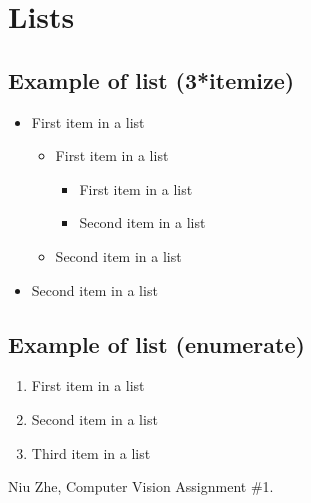 \documentclass[paper=a4, fontsize=11pt]{scrartcl} %
\numberwithin{equation}{section} %
\numberwithin{figure}{section} %
\numberwithin{table}{section} %
\begin{document}
\section{Lists}


\subsection{Example of list (3*itemize)}
\begin{itemize}
	\item First item in a list 
		\begin{itemize}
		\item First item in a list 
			\begin{itemize}
			\item First item in a list 
			\item Second item in a list 
			\end{itemize}
		\item Second item in a list 
		\end{itemize}
	\item Second item in a list 
\end{itemize}


\subsection{Example of list (enumerate)}
\begin{enumerate}
\item First item in a list 
\item Second item in a list 
\item Third item in a list
\end{enumerate}


\renewcommand\refname{Reference}

\begin{thebibliography}{99}
Niu Zhe, Computer Vision Assignment \#1.
\end{thebibliography}
\end{document}
